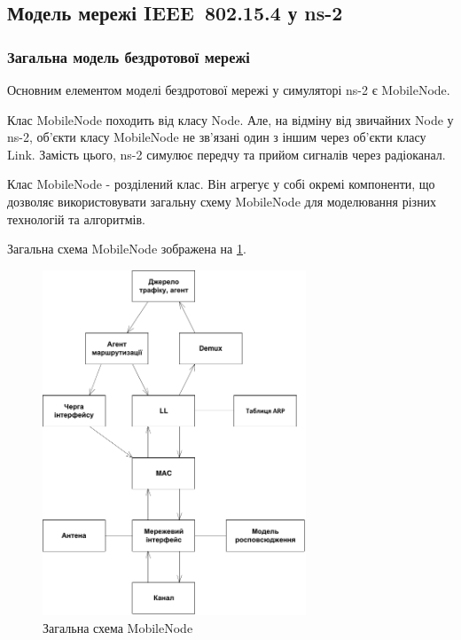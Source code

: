 \documentclass[a4paper,ukrainian,utf8,nocolumnsxix,floatsection,equationsection]{eskdtext}
\renewcommand\paragraph{\subsubsection}
\newcommand{\iee}[0]{IEEE~802.15.4\xspace}
\begin{document}
\subsection{Модель мережі \iee у ns-2}

\paragraph{Загальна модель бездротової мережі}

Основним елементом моделі бездротової мережі у симуляторі ns-2 є MobileNode. 

Клас MobileNode походить від класу Node. Але, на відміну від звичайних Node у ns-2, об’єкти класу MobileNode не зв’язані один з іншим через об’єкти класу Link. Замість цього, ns-2 симулює передчу та прийом сигналів через радіоканал.

Клас MobileNode - розділений клас. Він агрегує у собі окремі компоненти, що дозволяє використовувати загальну схему MobileNode для моделювання різних технологій та алгоритмів. 

Загальна схема MobileNode зображена на \ref{fig:mobile_node}.

\begin{figure}[bth]
	\centering
	\includegraphics[width=0.7\textwidth]{img/mobile_node.pdf}
	\caption{\label{fig:mobile_node}Загальна схема MobileNode}
\end{figure}
\end{document}
